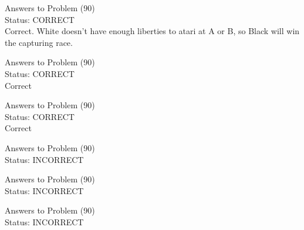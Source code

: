 \documentclass[11pt]{article}
\begin{document}
\begin{minipage}[t]{0.5\textwidth}
  {\centering
  
  Answers to Problem (90)\\
  Status: CORRECT\\
  Correct. White doesn't have enough liberties to atari at A or B, so Black will win the capturing race.\\
  }
\end{minipage}
\begin{minipage}[t]{0.5\textwidth}
  {\centering
  
  Answers to Problem (90)\\
  Status: CORRECT\\
  Correct\\
  }
\end{minipage}
\begin{minipage}[t]{0.5\textwidth}
  {\centering
  
  Answers to Problem (90)\\
  Status: CORRECT\\
  Correct\\
  }
\end{minipage}
\begin{minipage}[t]{0.5\textwidth}
  {\centering
  
  Answers to Problem (90)\\
  Status: INCORRECT\\
  
  }
\end{minipage}
\begin{minipage}[t]{0.5\textwidth}
  {\centering
  
  Answers to Problem (90)\\
  Status: INCORRECT\\
  
  }
\end{minipage}
\begin{minipage}[t]{0.5\textwidth}
  {\centering
  
  Answers to Problem (90)\\
  Status: INCORRECT\\
  
  }
\end{minipage}
\end{document}
